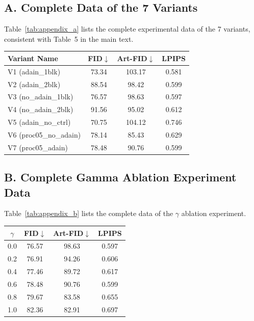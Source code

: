 \documentclass[10pt,twocolumn]{article}
\begin{document}
\subsection*{A. Complete Data of the 7 Variants}

Table~\ref{tab:appendix_a} lists the complete experimental data of the 7 variants, consistent with Table~5 in the main text.

\begin{center}
  \centering
  \small
  \label{tab:appendix_a}
  \vspace{-2pt}
  \begin{tabular}{lccc}
    \toprule
    Variant Name & FID$\downarrow$ & Art-FID$\downarrow$ & LPIPS \\
    \midrule
    V1 (adain\_1blk)       & 73.34 & 103.17 & 0.581 \\
    V2 (adain\_2blk)       & 88.54 & 98.42  & 0.599 \\
    V3 (no\_adain\_1blk)   & 76.57 & 98.63  & 0.597 \\
    V4 (no\_adain\_2blk)   & 91.56 & 95.02  & 0.612 \\
    V5 (adain\_no\_ctrl)   & 70.75 & 104.12 & 0.746 \\
    V6 (proc05\_no\_adain) & 78.14 & 85.43  & 0.629 \\
    V7 (proc05\_adain)     & 78.48 & 90.76  & 0.599 \\
    \bottomrule
  \end{tabular}
\end{center}

\subsection*{B. Complete Gamma Ablation Experiment Data}

Table~\ref{tab:appendix_b} lists the complete data of the $\gamma$ ablation experiment.

\begin{center}
  \centering
  \small
  \label{tab:appendix_b}
  \vspace{-2pt}
  \begin{tabular}{cccc}
    \toprule
    $\gamma$ & FID$\downarrow$ & Art-FID$\downarrow$ & LPIPS \\
    \midrule
    0.0 & 76.57 & 98.63 & 0.597 \\
    0.2 & 76.91 & 94.26 & 0.606 \\
    0.4 & 77.46 & 89.72 & 0.617 \\
    0.6 & 78.48 & 90.76 & 0.599 \\
    0.8 & 79.67 & 83.58 & 0.655 \\
    1.0 & 82.36 & 82.91 & 0.697 \\
    \bottomrule
  \end{tabular}
\end{center}

\endgroup
\end{document}
